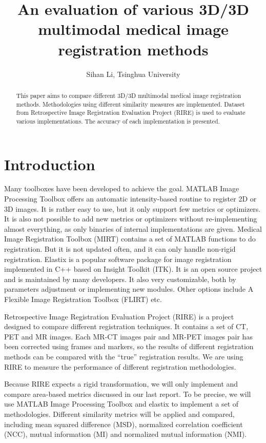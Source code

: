 \documentclass{IEEEtran}
\title{An evaluation of various 3D/3D multimodal medical image registration methods}
\author{Sihan Li, Tsinghua University}
\begin{document}
  \maketitle

  \begin{abstract}
    This paper aims to compare different 3D/3D multimodal medical image registration methods. Methodologies using different similarity measures are implemented. Dataset from Retrospective Image Registration Evaluation Project (RIRE) is used to evaluate various implementations. The accuracy of each implementation is presented.

  \end{abstract}

  \section{Introduction}
    Many toolboxes have been developed to achieve the goal. MATLAB Image Processing Toolbox offers an automatic intensity-based routine to register 2D or 3D images. It is rather easy to use, but it only support few metrics or optimizers. It is also not possible to add new metrics or optimizers without re-implementing almost everything, as only binaries of internal implementations are given. Medical Image Registration Toolbox (MIRT) \cite{myronenko2007lv, myronenko2009adaptive, myronenko2009image, myronenko2009maximum, myronenko2010intensity} contains a set of MATLAB functions to do registration. But it is not updated often, and it can only handle non-rigid registration. Elastix \cite{klein2010elastix} is a popular software package for image registration implemented in C++ based on Insight Toolkit (ITK). It is an open source project and is maintained by many developers. It also very customizable, both by parameters adjustment or implementing new modules. Other options include A Flexible Image Registration Toolbox (FLIRT) \cite{papenberg2007fast} etc.

    Retrospective Image Registration Evaluation Project (RIRE) is a project designed to compare different registration techniques. It contains a set of CT, PET and MR images. Each MR-CT images pair and MR-PET images pair has been corrected using frames and markers, so the results of different registration methods can be compared with the ``true'' registration results. We are using RIRE to measure the performance of different registration methodologies.

    Because RIRE expects a rigid transformation, we will only implement and compare area-based metrics discussed in our last report. To be precise, we will use MATLAB Image Processing Toolbox and elastix to implement a set of methodologies. Different similarity metrics will be applied and compared, including mean squared difference (MSD), normalized correlation coefficient (NCC), mutual information (MI) and normalized mutual information (NMI).
\end{document}
